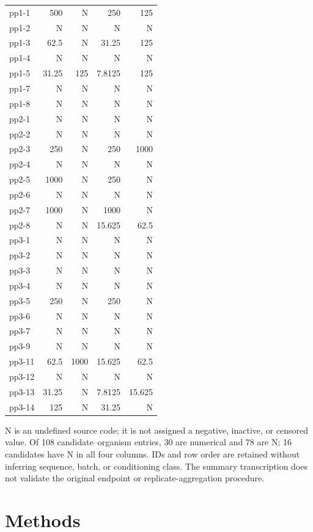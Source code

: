 \documentclass[journal]{IEEEtran}
\begin{document}
\begin{table}[!t]
\begin{tabular*}{\textwidth}{@{\extracolsep{\fill}}lrrrr@{}}
pp1-1 & 500 & N & 250 & 125 \\
pp1-2 & N & N & N & N \\
pp1-3 & 62.5 & N & 31.25 & 125 \\
pp1-4 & N & N & N & N \\
pp1-5 & 31.25 & 125 & 7.8125 & 125 \\
pp1-7 & N & N & N & N \\
pp1-8 & N & N & N & N \\
pp2-1 & N & N & N & N \\
pp2-2 & N & N & N & N \\
pp2-3 & 250 & N & 250 & 1000 \\
pp2-4 & N & N & N & N \\
pp2-5 & 1000 & N & 250 & N \\
pp2-6 & N & N & N & N \\
pp2-7 & 1000 & N & 1000 & N \\
pp2-8 & N & N & 15.625 & 62.5 \\
pp3-1 & N & N & N & N \\
pp3-2 & N & N & N & N \\
pp3-3 & N & N & N & N \\
pp3-4 & N & N & N & N \\
pp3-5 & 250 & N & 250 & N \\
pp3-6 & N & N & N & N \\
pp3-7 & N & N & N & N \\
pp3-9 & N & N & N & N \\
pp3-11 & 62.5 & 1000 & 15.625 & 62.5 \\
pp3-12 & N & N & N & N \\
pp3-13 & 31.25 & N & 7.8125 & 15.625 \\
pp3-14 & 125 & N & 31.25 & N \\
\bottomrule
\end{tabular*}
\endgroup
\par\medskip
\parbox{\textwidth}{\raggedright N is an undefined source code; it is not assigned a negative, inactive, or censored value. Of 108 candidate--organism entries, 30 are numerical and 78 are N; 16 candidates have N in all four columns. IDs and row order are retained without inferring sequence, batch, or conditioning class. The summary transcription does not validate the original endpoint or replicate-aggregation procedure.}
\end{table}

\section{Methods}
\end{document}
